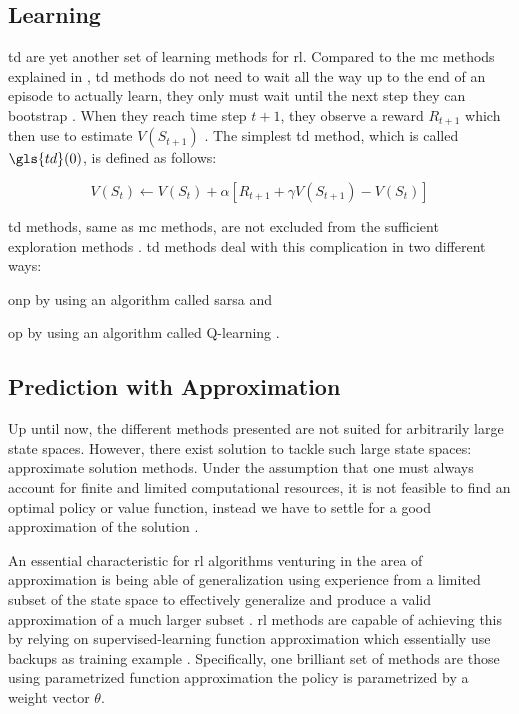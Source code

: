 \documentclass{seal_thesis}
\begin{document}
\subsection{ Learning}
\label{subsec:td_learning}

\gls{td} are yet another set of learning methods for \gls{rl}. Compared to the \gls{mc} methods explained in , \gls{td} methods do not need to wait all the way up to the end of an episode to actually learn, they only must wait until the next step \ie they can bootstrap \cite[p. 128]{Sutton2017}. When they reach time step $t+1$, they observe a reward $R_{t+1}$ which then use to estimate $V(S_{t+1})$ \cite[p. 128]{Sutton2017}. The simplest \gls{td} method, which is called $\gls{td}(0)$, is defined as follows:

\begin{equation}
\label{eq:td_update}
	V(S_t) \leftarrow V(S_t) + \alpha [R_{t+1} + \gamma V(S_{t+1}) - V(S_t)]
\end{equation}

\gls{td} methods, same as \gls{mc} methods, are not  excluded from the sufficient exploration methods \cite[p. 147]{Sutton2017}. \gls{td} methods deal with this complication in two different ways:
\begin{enumerate*}
	\item \gls{onp} by using an algorithm called \gls{sarsa} and
	\item \gls{op} by using an algorithm called Q-learning \cite[p. 128]{Sutton2017}.
\end{enumerate*}

\subsection{ Prediction with Approximation}
\label{subsec:onpol_pred}

Up until now, the different methods presented are not suited for arbitrarily large state spaces. However, there exist solution to tackle such large state spaces: approximate solution methods. Under the assumption that one must always account for finite and limited computational resources, it is not feasible to find an optimal policy or value function, instead we have to settle for a good approximation of the solution \cite[p. 189]{Sutton2017}.

An essential characteristic for \gls{rl} algorithms venturing in the area of approximation is being able of generalization \ie using experience from a limited subset of the state space to effectively generalize and produce a valid approximation of a much larger subset  \cite[p. 189]{Sutton2017}. \gls{rl} methods are capable of achieving this by relying on supervised-learning function approximation which essentially use backups as training example \cite[p. 222]{Sutton2017}. Specifically, one brilliant set of methods are those using parametrized function approximation \ie the policy is parametrized by a weight vector $\theta$.
\end{document}
